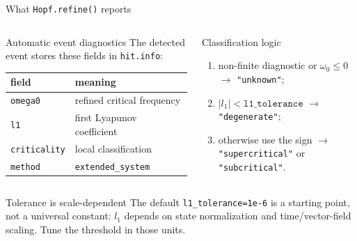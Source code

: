 \begin{frame}{What \texttt{Hopf.refine()} reports}
\begin{columns}[T]
\begin{block}{Automatic event diagnostics}
The detected event stores these fields in \texttt{hit.info}:
\begin{center}
\begin{tabular}{@{}ll@{}}
\toprule
field & meaning \\
\midrule
\texttt{omega0} & refined critical frequency \\
\texttt{l1} & first Lyapunov coefficient \\
\texttt{criticality} & local classification \\
\texttt{method} & \texttt{extended\_system} \\
\bottomrule
\end{tabular}
\end{center}
\end{block}
\begin{block}{Classification logic}
\begin{enumerate}
  \item non-finite diagnostic or $\omega_0\leq0$
        $\rightarrow$ \texttt{"unknown"};
  \item $|l_1|<\texttt{l1\_tolerance}$
        $\rightarrow$ \texttt{"degenerate"};
  \item otherwise use the sign
        $\rightarrow$ \texttt{"supercritical"} or
        \texttt{"subcritical"}.
\end{enumerate}
\end{block}
\end{columns}
\begin{alertblock}{Tolerance is scale-dependent}
The default \texttt{l1\_tolerance=1e-6} is a starting point, not a universal
constant: $l_1$ depends on state normalization and time/vector-field scaling.
Tune the threshold in those units.
\end{alertblock}
\end{frame}

